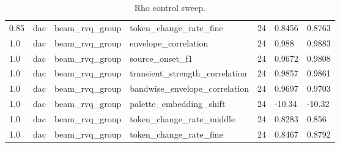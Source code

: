 \begin{table}[t]
\begin{tabular}{lllllll}
0.85 & dac & beam\_rvq\_group & token\_change\_rate\_fine & 24 & 0.8456 & 0.8763 \\
1.0 & dac & beam\_rvq\_group & envelope\_correlation & 24 & 0.988 & 0.9883 \\
1.0 & dac & beam\_rvq\_group & source\_onset\_f1 & 24 & 0.9672 & 0.9808 \\
1.0 & dac & beam\_rvq\_group & transient\_strength\_correlation & 24 & 0.9857 & 0.9861 \\
1.0 & dac & beam\_rvq\_group & bandwise\_envelope\_correlation & 24 & 0.9697 & 0.9703 \\
1.0 & dac & beam\_rvq\_group & palette\_embedding\_shift & 24 & -10.34 & -10.32 \\
1.0 & dac & beam\_rvq\_group & token\_change\_rate\_middle & 24 & 0.8283 & 0.856 \\
1.0 & dac & beam\_rvq\_group & token\_change\_rate\_fine & 24 & 0.8467 & 0.8792 \\
\bottomrule
\end{tabular}
\caption{Rho control sweep.}
\label{tab:rho-sweep}
\end{table}